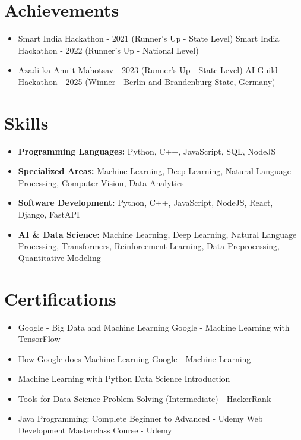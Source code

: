\documentclass[a4paper,10pt]{article}
\begin{document}
\section*{Achievements}
\begin{itemize}
\item Smart India Hackathon - 2021 (Runner's Up - State Level) \hfill Smart India Hackathon - 2022 (Runner's Up - National Level)
\item Azadi ka Amrit Mahotsav - 2023 (Runner's Up - State Level) \hfill AI Guild Hackathon - 2025 (Winner - Berlin and Brandenburg State, Germany)
\end{itemize}

\section*{Skills}
\begin{itemize}
  \item \textbf{Programming Languages:} Python, C++, JavaScript, SQL, NodeJS
  \item \textbf{Specialized Areas:} Machine Learning, Deep Learning, Natural Language Processing, Computer Vision, Data Analytics
  \item \textbf{Software Development:} Python, C++, JavaScript, NodeJS, React, Django, FastAPI
  \item \textbf{AI \& Data Science:} Machine Learning, Deep Learning, Natural Language Processing, Transformers, Reinforcement Learning, Data Preprocessing, Quantitative Modeling
\end{itemize}

\section*{Certifications}
\begin{itemize}
\item Google - Big Data and Machine Learning \hfill Google - Machine Learning with TensorFlow
\item How Google does Machine Learning \hfill Google - Machine Learning
\item Machine Learning with Python \hfill Data Science Introduction
\item Tools for Data Science \hfill Problem Solving (Intermediate) - HackerRank
\item Java Programming: Complete Beginner to Advanced - Udemy \hfill Web Development Masterclass Course - Udemy
\end{itemize}
\end{document}
